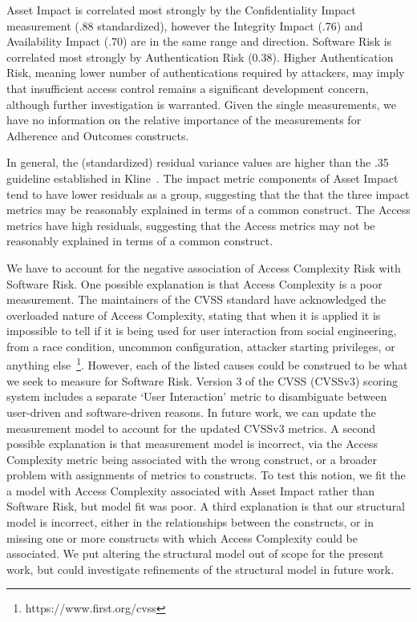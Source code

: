 Asset Impact is correlated most strongly by the Confidentiality Impact measurement (.88 standardized), however the Integrity Impact (.76) and Availability Impact (.70) are in the same range and direction. Software Risk is correlated most strongly by Authentication Risk (0.38). Higher Authentication Risk, meaning lower number of authentications required by attackers, may imply that insufficient access control remains a significant development concern, although further investigation is warranted. Given the single measurements, we have no information on the relative importance of the measurements for Adherence and Outcomes constructs.

In general, the (standardized) residual variance values are higher than the .35 guideline established in Kline~\cite{kline2015principles}. The impact metric components of Asset Impact tend to have lower residuals as a group, suggesting that the that the three impact metrics may be reasonably explained in terms of a common construct. The Access metrics have high residuals, suggesting that the Access metrics may not be reasonably explained in terms of a common construct. 

We have to account for the negative association of Access Complexity Risk with Software Risk.  One possible explanation is that Access Complexity is a poor measurement. The maintainers of the CVSS standard have acknowledged the overloaded nature of Access Complexity, stating that when it is applied it is impossible to tell if it is being used for user interaction from social engineering, from a race condition, uncommon configuration, attacker starting privileges, or anything else~\footnote{https://www.first.org/cvss}. However, each of the listed causes could be construed to be what we seek to measure for Software Risk. Version 3 of the CVSS (CVSSv3) scoring system includes a separate `User Interaction' metric to disambiguate between user-driven and software-driven reasons. In future work, we can update the measurement model to account for the updated CVSSv3 metrics. A second possible explanation is that measurement model is incorrect, via the Access Complexity metric being associated with the wrong construct, or a broader problem with assignments of metrics to constructs. To test this notion, we fit the a model with Access Complexity associated with Asset Impact rather than Software Risk, but model fit was poor. A third explanation is that our structural model is incorrect, either in the relationships between the constructs, or in missing one or more constructs with which Access Complexity could be associated. We put altering the structural model out of scope for the present work, but could investigate refinements of the structural model in future work. 

